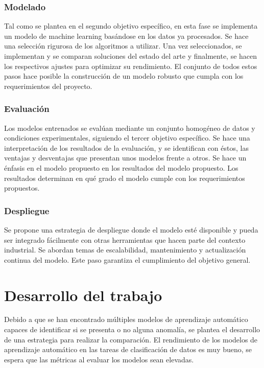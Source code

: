 \documentclass[11pt,a4paper,spanish]{book}
\numberwithin{equation}{chapter}
\numberwithin{figure}{chapter}
\begin{document}
\subsection{Modelado}


Tal como se plantea en el segundo objetivo específico, en esta fase se implementa un 
modelo de machine learning basándose en los datos ya procesados. Se hace una selección 
rigurosa de los algoritmos a utilizar. Una vez seleccionados, se implementan y se 
comparan soluciones del estado del arte y finalmente, se hacen los respectivos ajustes 
para optimizar su rendimiento.
El conjunto de todos estos pasos hace posible la construcción de un modelo robusto que 
cumpla con los requerimientos del proyecto. 


\subsection{Evaluación}

Los modelos entrenados se evalúan mediante un conjunto homogéneo de datos y condiciones 
experimentales, siguiendo el tercer objetivo específico. Se hace una interpretación de 
los resultados de la evaluación, y se identifican con éstos, las ventajas y desventajas 
que presentan unos modelos frente a otros. 
Se hace un énfasis en el modelo propuesto en los resultados del modelo propuesto. 
Los resultados determinan en qué grado el modelo cumple con los requerimientos propuestos. 

\subsection{Despliegue}

Se propone una estrategia de despliegue donde el modelo esté disponible y pueda ser 
integrado fácilmente con otras herramientas que hacen parte del contexto industrial. 
Se abordan temas de escalabilidad, mantenimiento y actualización continua del modelo. 
Este paso garantiza el cumplimiento del objetivo general. 



\chapter{Desarrollo del trabajo}

Debido a que se han encontrado múltiples modelos de aprendizaje automático capaces de identificar si se presenta o no alguna anomalía, se plantea el desarrollo de una estrategia para realizar la comparación. El rendimiento de los modelos de aprendizaje automático en las tareas de clasificación de datos es muy bueno, se espera que las métricas al evaluar los modelos sean elevadas. 
\end{document}
